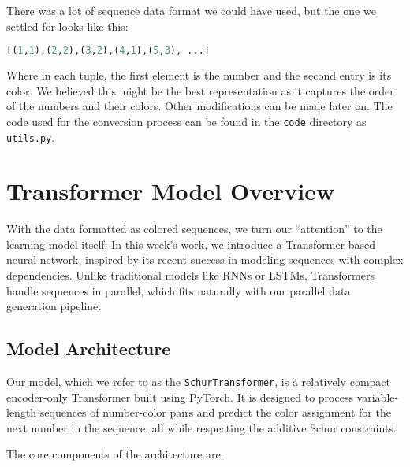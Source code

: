 \documentclass[12pt]{article}
\begin{document}
There was a lot of sequence data format we could have used, but the one we settled for looks like this:
\begin{lstlisting}[language=Python]
    [(1,1),(2,2),(3,2),(4,1),(5,3), ...]
\end{lstlisting}
Where in each tuple, the first element is the number and the second entry is its color. We believed this might be the best representation as it captures the order of the numbers and their colors. Other modifications can be made later on.
The code used for the conversion process can be found in the \texttt{code} directory as \texttt{utils.py}.

\section{Transformer Model Overview}

With the data formatted as colored sequences, we turn our ``attention'' to the learning model itself. In this week’s work, we introduce a Transformer-based neural network, inspired by its recent success in modeling sequences with complex dependencies. Unlike traditional models like RNNs or LSTMs, Transformers handle sequences in parallel, which fits naturally with our parallel data generation pipeline.

\subsection{Model Architecture}

Our model, which we refer to as the \texttt{SchurTransformer}, is a relatively compact encoder-only Transformer built using PyTorch. It is designed to process variable-length sequences of number-color pairs and predict the color assignment for the next number in the sequence, all while respecting the additive Schur constraints.

The core components of the architecture are:
\end{document}
